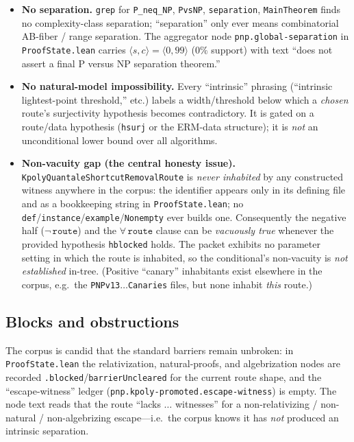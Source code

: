 \begin{itemize}
  \item \textbf{No separation.} \texttt{grep} for
  \texttt{P\_neq\_NP}, \texttt{PvsNP}, \texttt{separation},
  \texttt{MainTheorem} finds no complexity-class separation; ``separation''
  only ever means combinatorial AB-fiber / range separation. The aggregator
  node \texttt{pnp.global-separation} in \texttt{ProofState.lean} carries
  $\langle s,c\rangle=\langle 0,99\rangle$ ($0\%$ support) with text ``does not
  assert a final P versus NP separation theorem.''
  \item \textbf{No natural-model impossibility.} Every ``intrinsic'' phrasing
  (``intrinsic lightest-point threshold,'' etc.) labels a width/threshold below
  which a \emph{chosen} route's surjectivity hypothesis becomes contradictory.
  It is gated on a route/data hypothesis (\texttt{hsurj} or the ERM-data
  structure); it is \emph{not} an unconditional lower bound over all algorithms.
  \item \textbf{Non-vacuity gap (the central honesty issue).}
  \texttt{KpolyQuantaleShortcutRemovalRoute} is \emph{never inhabited} by any
  constructed witness anywhere in the corpus: the identifier appears only in its
  defining file and as a bookkeeping string in \texttt{ProofState.lean}; no
  \texttt{def}/\texttt{instance}/\texttt{example}/\texttt{Nonempty} ever builds
  one. Consequently the negative half ($\lnot\,\texttt{route}$) and the
  $\forall\,\texttt{route}$ clause can be \emph{vacuously true} whenever the
  provided hypothesis \texttt{hblocked} holds. The packet exhibits no parameter
  setting in which the route is inhabited, so the conditional's non-vacuity is
  \emph{not established} in-tree. (Positive ``canary'' inhabitants exist
  elsewhere in the corpus, e.g.\ the \texttt{PNPv13$\dots$Canaries} files, but
  none inhabit \emph{this} route.)
\end{itemize}

\subsection{Blocks and obstructions}
\label{sec:pnp-blocks}

The corpus is candid that the standard barriers remain unbroken: in
\texttt{ProofState.lean} the relativization, natural-proofs, and algebrization
nodes are recorded \texttt{.blocked}/\texttt{barrierUncleared} for the current
route shape, and the ``escape-witness'' ledger
(\texttt{pnp.kpoly-promoted.escape-witness}) is empty. The node text reads that
the route ``lacks $\dots$ witnesses'' for a non-relativizing /
non-natural / non-algebrizing escape---i.e.\ the corpus knows it has
\emph{not} produced an intrinsic separation.

